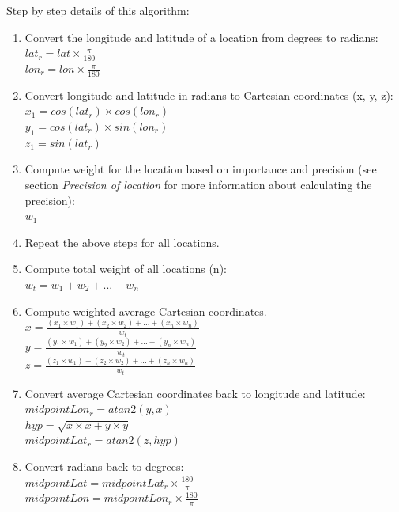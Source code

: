 \documentclass[twoside,openright,notitlepage]{uva-bachelor-thesis}
\begin{document}
Step by step details of this algorithm: 
\begin{enumerate}
\item Convert the longitude and latitude of a location from degrees to radians:\\
$lat_r = lat \times  \frac{\pi}{180}$\\
$lon_r = lon \times \frac{\pi}{180}$
\item Convert longitude and latitude in radians to Cartesian coordinates (x, y, z):\\
$x_1 = cos(lat_r) \times cos(lon_r)$\\
$y_1 = cos(lat_r) \times sin(lon_r)$\\
$z_1 = sin(lat_r)$
\item Compute weight for the location based on importance and precision (see section \emph{Precision of location} for more information about calculating the precision):\\
$w_1$
\item Repeat the above steps for all locations.
\item Compute total weight of all locations (n):\\
$w_t = w_1 + w_2 + ... + w_n$
\item Compute weighted average Cartesian coordinates.\\
$x = \frac{(x_1 \times w_1) + (x_2 \times w_2) + ... + (x_n \times w_n)}{w_t}$\\
$y = \frac{(y_1 \times w_1) + (y_2 \times w_2) + ... + (y_n \times w_n)}{w_t}$\\
$z = \frac{(z_1 \times w_1) + (z_2 \times w_2) + ... + (z_n \times w_n)}{w_t}$
\item Convert average Cartesian coordinates back to longitude and latitude:\\
$midpointLon_r = atan2(y, x)$\\
$hyp = \sqrt{x \times x + y \times y}$\\
$midpointLat_r = atan2(z, hyp)$
\item Convert radians back to degrees:\\
$midpointLat = midpointLat_r \times \frac{180}{\pi}$\\
$midpointLon = midpointLon_r \times \frac{180}{\pi}$
\end{enumerate}
\end{document}
